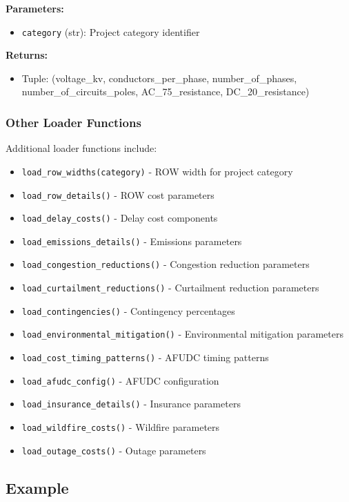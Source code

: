 \documentclass[ctcc_full_documentation.tex]{subfiles}
\begin{document}
\textbf{Parameters:}
\begin{itemize}
    \item \texttt{category} (str): Project category identifier
\end{itemize}

\textbf{Returns:}
\begin{itemize}
    \item Tuple: (voltage\_kv, conductors\_per\_phase, number\_of\_phases, number\_of\_circuits\_poles, AC\_75\_resistance, DC\_20\_resistance)
\end{itemize}

\subsubsection{Other Loader Functions}

Additional loader functions include:
\begin{itemize}
    \item \texttt{load\_row\_widths(category)} - ROW width for project category
    \item \texttt{load\_row\_details()} - ROW cost parameters
    \item \texttt{load\_delay\_costs()} - Delay cost components
    \item \texttt{load\_emissions\_details()} - Emissions parameters
    \item \texttt{load\_congestion\_reductions()} - Congestion reduction parameters
    \item \texttt{load\_curtailment\_reductions()} - Curtailment reduction parameters
    \item \texttt{load\_contingencies()} - Contingency percentages
    \item \texttt{load\_environmental\_mitigation()} - Environmental mitigation parameters
    \item \texttt{load\_cost\_timing\_patterns()} - AFUDC timing patterns
    \item \texttt{load\_afudc\_config()} - AFUDC configuration
    \item \texttt{load\_insurance\_details()} - Insurance parameters
    \item \texttt{load\_wildfire\_costs()} - Wildfire parameters
    \item \texttt{load\_outage\_costs()} - Outage parameters
\end{itemize}

\subsection{Example}
\end{document}
